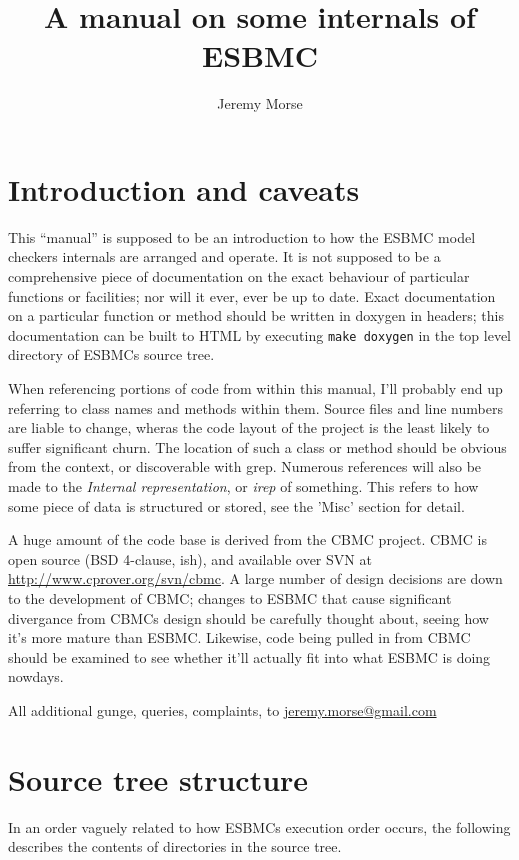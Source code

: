 \documentclass{article}
\newcommand{\subtitle}[1]{%
  \posttitle{%
    \par\end{center}
    \begin{center}\large#1\end{center}
    \vskip0.5em}%
}
\begin{document}
\author{Jeremy Morse}
\title{A manual on some internals of ESBMC}
\subtitle{Caveat lector}
\maketitle
\tableofcontents
\section{Introduction and caveats}

This ``manual'' is supposed to be an introduction to how the ESBMC model
checkers internals are arranged and operate. It is not supposed to be a
comprehensive piece of documentation on the exact behaviour of particular
functions or facilities; nor will it ever, ever be up to date. Exact
documentation on a particular function or method should be written in
doxygen in headers; this documentation can be built to HTML by executing
\texttt{make doxygen} in the top level directory of ESBMCs source tree.

When referencing portions of code from within this manual, I'll probably
end up referring to class names and methods within them. Source files and
line numbers are liable to change, wheras the code layout of the project
is the least likely to suffer significant churn. The location of such a
class or method should be obvious from the context, or discoverable with
grep. Numerous references will also be made to the \textit{Internal
representation}, or \textit{irep} of something. This refers to how some piece
of data is structured or stored, see the 'Misc' section for detail.

A huge amount of the code base is derived from the CBMC project. CBMC is
open source (BSD 4-clause, ish), and available over SVN at
\url{http://www.cprover.org/svn/cbmc}. A large number of design decisions
are down to the development of CBMC; changes to ESBMC that cause
significant divergance from CBMCs design should be carefully thought
about, seeing how it's more mature than ESBMC. Likewise, code being
pulled in from CBMC should be examined to see whether it'll actually fit
into what ESBMC is doing nowdays.

All additional gunge, queries, complaints, to \url{jeremy.morse@gmail.com}

\section{Source tree structure}

In an order vaguely related to how ESBMCs execution order occurs, the
following describes the contents of directories in the source tree.
\end{document}

